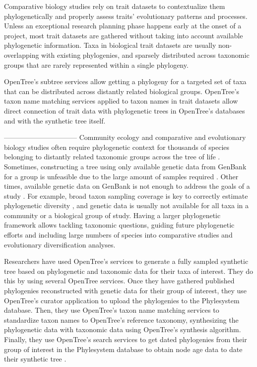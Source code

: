 \documentclass[oupdraft]{sysbio_sse}
\begin{document}
Comparative biology studies rely on trait datasets to contextualize them phylogenetically
and properly assess traits' evolutionary patterns and processes.
Unless an exceptional research planning phase happens early at the onset of a project,
most trait datasets are gathered without taking into account available phylogenetic information.
Taxa in biological trait datasets are usually non-overlapping with existing phylogenies,
and sparsely distributed across taxonomic groups that are rarely represented within
a single phylogeny.

OpenTree's subtree services allow getting a phylogeny for a targeted set of taxa
that can be distributed across distantly related biological groups.
OpenTree's taxon name matching services applied to taxon names in trait datasets
allow direct connection of trait data with phylogenetic trees in OpenTree's databases
and with the synthetic tree itself.


--------------------------------
Community ecology and comparative and evolutionary biology studies often require
phylogenetic context for thousands of species belonging to distantly related taxonomic
groups across the tree of life \citep{smith2018constructing}.
Sometimes, constructing a tree using only available genetic data from GenBank for a group
is unfeasible due to the large amount of samples required \citep{smith2018constructing}.
Other times, available genetic data on GenBank is not enough to address the goals
of a study \citep{owen2015synthetic, brown2017development, ewers2019towards}.
For example, broad taxon sampling coverage is key to correctly estimate phylogenetic
diversity \citep{jantzen2019effects, park2018taxon}, and genetic data is usually
not available for all taxa in a community or a biological group of study.
Having a larger phylogenetic framework allows tackling taxonomic questions,
guiding future phylogenetic efforts and including large numbers of species into
comparative studies \citep{ewers2019towards} and evolutionary diversification analyses.

Researchers have used OpenTree's services to generate a fully sampled synthetic tree based on phylogenetic and
taxonomic data for their taxa of interest. They do this by using several OpenTree services.
Once they have gathered published phylogenies reconstructed with genetic data for
their group of interest,
they use OpenTree's curator application to upload the phylogenies to the Phylesystem database.
Then, they use  OpenTree's taxon name matching services to standardize taxon names
to OpenTree's reference taxonomy, synthesizing the phylogenetic data with taxonomic data
using OpenTree's synthesis algorithm. Finally, they use OpenTree's search services
to get dated phylogenies from their group of interest in the Phylesystem database
to obtain node age data to date their synthetic tree
\citep{owen2015synthetic, brown2017development, ewers2019towards, smith2018constructing}.
\end{document}
